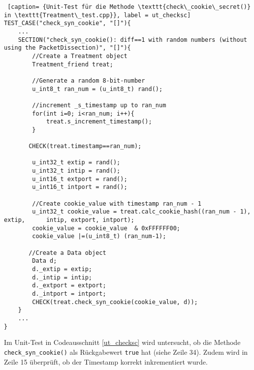 \documentclass[../review_3.tex]{subfiles}
\begin{document}
\begin{lstlisting} [caption= {Unit-Test für die Methode \texttt{check\_cookie\_secret()} in \texttt{Treatment\_test.cpp}}, label = ut_checksc]
TEST_CASE("check_syn_cookie", "[]"){
    ...
    SECTION("check_syn_cookie(): diff==1 with random numbers (without using the PacketDissection)", "[]"){
        //Create a Treatment object
        Treatment_friend treat;
            
        //Generate a random 8-bit-number
        u_int8_t ran_num = (u_int8_t) rand();
            
        //increment _s_timestamp up to ran_num
        for(int i=0; i<ran_num; i++){
            treat.s_increment_timestamp();
        }
            
       CHECK(treat.timestamp==ran_num);
            
        u_int32_t extip = rand();
        u_int32_t intip = rand();
        u_int16_t extport = rand();
        u_int16_t intport = rand();
            
        //Create cookie_value with timestamp ran_num - 1
        u_int32_t cookie_value = treat.calc_cookie_hash((ran_num - 1), extip,      intip, extport, intport);
        cookie_value = cookie_value  & 0xFFFFFF00;
        cookie_value |=(u_int8_t) (ran_num-1);
            
       //Create a Data object
        Data d;
        d._extip = extip;
        d._intip = intip;
        d._extport = extport;
        d._intport = intport;
        CHECK(treat.check_syn_cookie(cookie_value, d));
    }
    ...
} \end{lstlisting}
Im Unit-Test in Codeausschnitt \ref{ut_checksc} wird untersucht, ob die Methode \texttt{check\_syn\_cookie()} als Rückgabewert \texttt{true} hat (siehe Zeile 34). Zudem wird in Zeile 15 überprüft, ob der Timestamp korrekt inkrementiert wurde.
\end{document}
